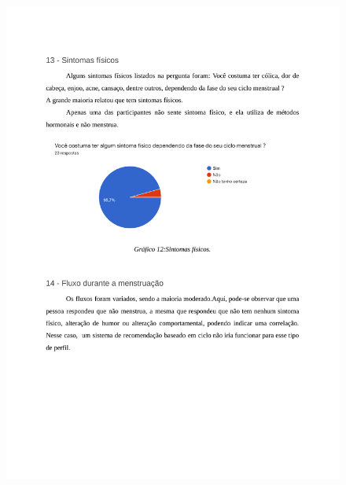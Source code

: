 \begin{apendicesenv}
    \begin{figure}[h]
        \centering
        \includegraphics[keepaspectratio=true,scale=0.7]{figuras/Tab11.pdf}
    \end{figure}
    

\end{apendicesenv}
